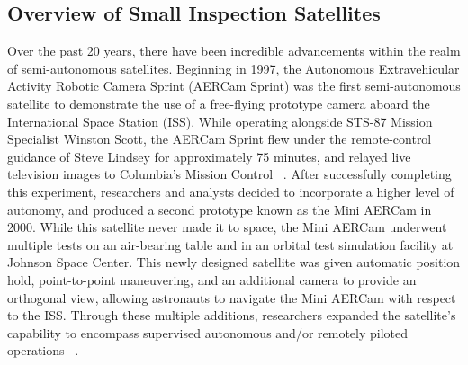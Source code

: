 \documentclass[journal, 10pt]{IEEEtran}
\begin{document}
\subsection{Overview of Small Inspection Satellites}
Over the past 20 years, there have been incredible advancements within the realm of semi-autonomous satellites. Beginning in 1997, the Autonomous Extravehicular Activity Robotic Camera Sprint (AERCam Sprint) was the first semi-autonomous satellite to demonstrate the use of a free-flying prototype camera aboard the International Space Station (ISS). While operating alongside STS-87 Mission Specialist Winston Scott, the AERCam Sprint flew under the remote-control guidance of Steve Lindsey for approximately 75 minutes, and relayed live television images to Columbia's Mission Control ~\cite{Aercam, MiniAercam}. After successfully completing this experiment, researchers and analysts decided to incorporate a higher level of autonomy, and produced a second prototype known as the Mini AERCam in 2000. While this satellite never made it to space, the Mini AERCam underwent multiple tests on an air-bearing table and in an orbital test simulation facility at Johnson Space Center. This newly designed satellite was given automatic position hold, point-to-point maneuvering, and an additional camera to provide an orthogonal view, allowing astronauts to navigate the Mini AERCam with respect to the ISS. Through these multiple additions, researchers expanded the satellite's capability to encompass supervised autonomous and/or remotely piloted operations ~\cite{MiniAercam, MiniAercam2}.
\end{document}
